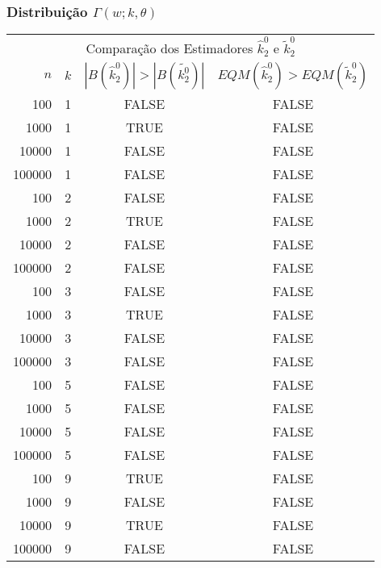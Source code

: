 \begin{frame}
  \frametitle{Distribuição $\Gamma(w;k,\theta)$}
  \tiny
  \begin{table}[h]
    \label{tab:gamma_r_m1}
    \centering
    \begin{tabular}{rccc}
      \toprule
      \multicolumn{4}{c}{Comparação dos Estimadores $\hat{k}_2^0$ e $\tilde{k}_2^0$}\\
      $n$ & $k$ & $|B(\hat{k}_2^0)|>|B(\tilde{k_2^0})|$ & $EQM(\hat{k}_2^0)>EQM(\tilde{k}_2^0)$ \\
      \midrule
      100 & 1 & FALSE & FALSE\\
      1000 & 1 & TRUE & FALSE\\
      10000 & 1 & FALSE & FALSE\\
      100000 & 1 & FALSE & FALSE\\
      100 & 2 & FALSE & FALSE\\
      1000 & 2 & TRUE & FALSE\\
      10000 & 2 & FALSE & FALSE\\
      100000 & 2 & FALSE & FALSE\\
      100 & 3 & FALSE & FALSE\\
      1000 & 3 & TRUE & FALSE\\
      10000 & 3 & FALSE & FALSE\\
      100000 & 3 & FALSE & FALSE\\
      100 & 5 & FALSE & FALSE\\
      1000 & 5 & FALSE & FALSE\\
      10000 & 5 & FALSE & FALSE\\
      100000 & 5 & FALSE & FALSE\\
      100 & 9 & TRUE & FALSE\\
      1000 & 9 & FALSE & FALSE\\
      10000 & 9 & TRUE & FALSE\\
      100000 & 9 & FALSE & FALSE\\
      \bottomrule
    \end{tabular}
  \end{table}
\end{frame}


